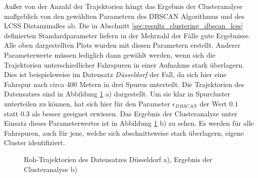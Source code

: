Außer von der Anzahl der Trajektorien hängt das Ergebnis der Clusteranalyse maßgeblich von den gewählten
Parametern des DBSCAN Algorithmus und des LCSS Distanzmaßes ab. Die in Abschnitt \ref{sec:results_clustering_dbscan_lcss} definierten
Standardparameter liefern in der Mehrzahl der Fälle gute Ergebnisse. Alle oben dargestellten Plots
wurden mit diesen Parametern erstellt.
Anderer Parameterwerte müssen lediglich dann gewählt werden, wenn sich die Trajektorien unterschiedlicher
Fahrspuren in einer Aufnahme stark überlagern.
Dies ist beispielsweise im Datensatz \textit{Düsseldorf} der Fall, da sich hier eine Fahrspur nach circa 400 Metern in drei Spuren unterteilt.
Die Trajektorien des Datensatzes sind in Abbildung \ref{fig:results_clusters_duesseldorf} a) dargestellt.
Um sie klar in Spurcluster unterteilen zu können, hat sich hier für den Parameter $\epsilon_{DBSCAN}$
der Wert $0.1$ statt $0.3$ als besser geeignet erwiesen. Das Ergebnis der Clusteranalyse
unter Einsatz dieses Parameterwertes ist in Abbildung \ref{fig:results_clusters_duesseldorf} b) zu sehen.
Es werden für alle Fahrspuren, auch für jene, welche sich abschnittsweise stark überlagern, eigene Cluster
identifiziert.

\begin{figure}[H]
    \centering
    \qquad \qquad
    \caption[Ergebnis Clusteranalyse Düsseldorf Datensatz]
            {Roh-Trajektorien des Datensatzes Düsseldorf a), Ergebnis der Clusteranalyse b)}
    \label{fig:results_clusters_duesseldorf}
\end{figure}

